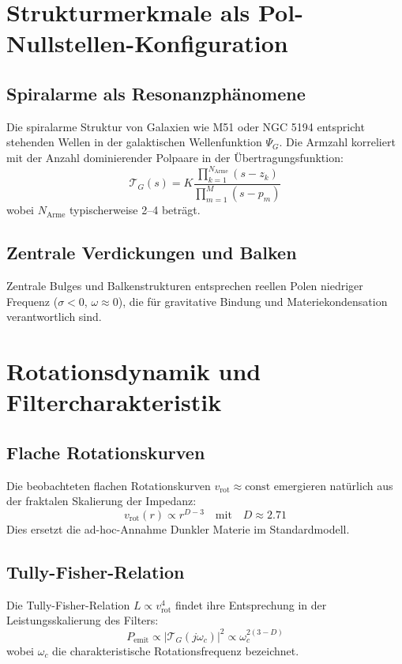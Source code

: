 \section{Strukturmerkmale als Pol-Nullstellen-Konfiguration}

\subsection{Spiralarme als Resonanzphänomene}
Die spiralarme Struktur von Galaxien wie M51 oder NGC 5194 entspricht stehenden Wellen in der galaktischen Wellenfunktion $\Psi_G$. Die Armzahl korreliert mit der Anzahl
dominierender Polpaare in der Übertragungsfunktion:
\[
\mathcal{T}_G(s) = K \frac{\prod_{k=1}^{N_{\text{Arme}}}(s - z_k)}{\prod_{m=1}^{M}(s - p_m)}
\]
wobei $N_{\text{Arme}}$ typischerweise 2--4 beträgt.

\subsection{Zentrale Verdickungen und Balken}
Zentrale Bulges und Balkenstrukturen entsprechen reellen Polen niedriger Frequenz ($\sigma < 0$, $\omega \approx 0$), die für gravitative Bindung und Materiekondensation
verantwortlich sind.

\section{Rotationsdynamik und Filtercharakteristik}

\subsection{Flache Rotationskurven}
Die beobachteten flachen Rotationskurven $v_{\text{rot}} \approx \text{const}$ emergieren natürlich aus der fraktalen Skalierung der Impedanz:
\[
v_{\text{rot}}(r) \propto r^{D-3} \quad \text{mit} \quad D \approx 2.71
\]
Dies ersetzt die ad-hoc-Annahme Dunkler Materie im Standardmodell.

\subsection{Tully-Fisher-Relation}
Die Tully-Fisher-Relation $L \propto v_{\text{rot}}^4$ findet ihre Entsprechung in der Leistungsskalierung des Filters:
\[
P_{\text{emit}} \propto |\mathcal{T}_G(j\omega_c)|^2 \propto \omega_c^{2(3-D)}
\]
wobei $\omega_c$ die charakteristische Rotationsfrequenz bezeichnet.


